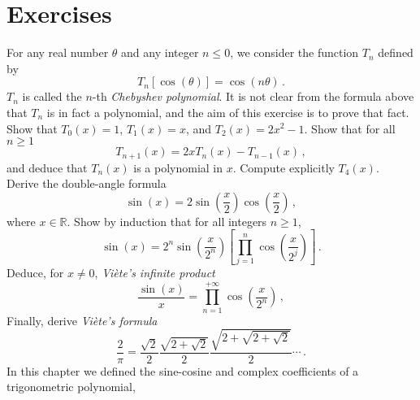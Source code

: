 \section{Exercises}
\begin{ExerciseList}
  \Exercise[label=chebyshev]
  For any real number $\theta$ and any integer $n\leq 0$, we consider the function $T_n$ defined by
  \begin{equation}
    T_n[\cos(\theta)]=\cos(n\theta)\,.
  \end{equation}
  $T_n$ is called the $n$-th \emph{Chebyshev polynomial}. It is not clear from the formula
  above that $T_n$ is in fact a polynomial, and the aim of this exercise is to prove that fact.
  \Question Show that $T_0(x)=1$, $T_1(x)=x$, and $T_2(x)=2x^2-1$.
  \Question Show that for all $n\geq 1$
  \begin{equation}
    T_{n+1}(x)=2x T_n(x)-T_{n-1}(x)\,,
  \end{equation}
  and deduce that $T_n(x)$ is a polynomial in $x$.
  \Question Compute explicitly $T_4(x)$.
  \Exercise[label=viete]~
  \Question Derive the double-angle formula
  \begin{equation}
    \sin(x)=2\sin\left(\frac{x}{2}\right)\cos\left(\frac{x}{2}\right)\,,
  \end{equation}
  where $x\in\mathbb{R}$.
  \Question Show by induction that for all integers $n\geq 1$,
  \begin{equation}
    \sin(x)=2^n\sin\left(\frac{x}{2^n}\right)\left[\prod_{j=1}^n\cos\left(\frac{x}{2^j}\right)\right]\,.
  \end{equation}
  \Question Deduce, for $x\neq 0$, \emph{Viète's infinite product}
  \begin{equation}
    \frac{\sin(x)}{x}=\prod_{n=1}^{+\infty}\cos\left(\frac{x}{2^n}\right)\,,
  \end{equation}
  \Question Finally, derive \emph{Viète's formula}
  \begin{equation}
    \frac{2}{\pi}=\frac{\sqrt{2}}{2}\frac{\sqrt{2+\sqrt{2}}}{2}\frac{\sqrt{2+\sqrt{2+\sqrt{2}}
    }}{2}\cdots\,.
  \end{equation}
  \Exercise[label=ampphase]
  In this chapter we defined the sine-cosine and complex coefficients of a trigonometric polynomial,

\end{ExerciseList}
